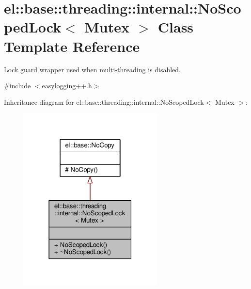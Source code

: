 \hypertarget{classel_1_1base_1_1threading_1_1internal_1_1NoScopedLock}{}\section{el\+:\+:base\+:\+:threading\+:\+:internal\+:\+:No\+Scoped\+Lock$<$ Mutex $>$ Class Template Reference}
\label{classel_1_1base_1_1threading_1_1internal_1_1NoScopedLock}


Lock guard wrapper used when multi-\/threading is disabled.  




{\ttfamily \#include $<$easylogging++.\+h$>$}



Inheritance diagram for el\+:\+:base\+:\+:threading\+:\+:internal\+:\+:No\+Scoped\+Lock$<$ Mutex $>$\+:
\nopagebreak
\begin{figure}[H]
\begin{center}
\leavevmode
\includegraphics[width=207pt]{d3/df0/classel_1_1base_1_1threading_1_1internal_1_1NoScopedLock__inherit__graph}
\end{center}
\end{figure}


